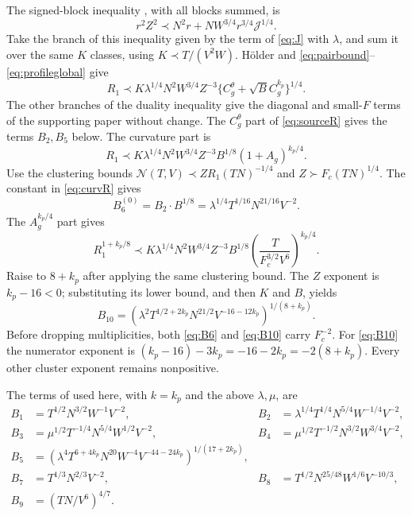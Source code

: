 \documentclass[11pt]{amsart}
\numberwithin{equation}{section}
\begin{document}
The signed-block inequality \cite[(\ref*{six-eq:rJ})]{Weighted}, with
all blocks summed, is
\[
 r^2Z^2\prec N^2r+NW^{3/4}r^{3/4}\mathcal J^{1/4}.
\]
Take the branch of this inequality given by the term of \eqref{eq:J}
with $\lambda$, and sum it over the same $K$ classes, using
\(K\prec T/(V^2W)\). H\"older and
\eqref{eq:pairbound}--\eqref{eq:profileglobal} give
\begin{equation}\label{eq:sourceR}
R_1\prec K\lambda^{1/4}N^2W^{3/4}Z^{-3}
       \{C_g^\theta+\sqrt B C_g^{k_p}\}^{1/4}.
\end{equation}
The other branches of the duality inequality give the diagonal
and small-$F$ terms of the supporting paper without change. The
\(C_g^\theta\) part of \eqref{eq:sourceR} gives the terms \(B_2,B_5\)
below. The curvature part is
\begin{equation}\label{eq:curvR}
R_1\prec K\lambda^{1/4}N^2W^{3/4}Z^{-3}
                        B^{1/8}(1+A_g)^{k_p/4}.
\end{equation}
Use the clustering bounds
\(\mathcal N(T,V)\prec ZR_1(TN)^{-1/4}\) and
\(Z\succ F_c(TN)^{1/4}\).
The constant in \eqref{eq:curvR} gives
\begin{equation}\label{eq:B6}
B_6^{(0)}=B_2\cdot B^{1/8}
     =\lambda^{1/4}T^{1/16}N^{21/16}V^{-2}.
\end{equation}
The \(A_g^{k_p/4}\) part gives
\[
 R_1^{1+k_p/8}\prec
 K\lambda^{1/4}N^2W^{3/4}Z^{-3}B^{1/8}
       \left(\frac{T}{F_c^{3/2}V^6}\right)^{k_p/4}.
\]
Raise to \(8+k_p\) after applying the same clustering bound.
The $Z$ exponent is \(k_p-16<0\); substituting its lower bound, and
then $K$ and $B$, yields
\begin{equation}\label{eq:B10}
\boxed{
 B_{10}=
 \left(\lambda^2T^{1/2+2k_p}N^{21/2}
                         V^{-16-12k_p}\right)^{1/(8+k_p)}.}
\end{equation}
Before dropping multiplicities, both \eqref{eq:B6} and \eqref{eq:B10} carry \(F_c^{-2}\).
For \eqref{eq:B10} the numerator exponent is
\((k_p-16)-3k_p=-16-2k_p=-2(8+k_p)\).
Every other cluster exponent remains nonpositive.

The terms of \cite[(\ref*{six-eq:nine})]{Weighted} used here, with
$k=k_p$ and the above $\lambda,\mu$, are
\[
\begin{aligned}
B_1&=T^{1/2}N^{3/2}W^{-1}V^{-2},&
B_2&=\lambda^{1/4}T^{1/4}N^{5/4}W^{-1/4}V^{-2},\\
B_3&=\mu^{1/2}T^{-1/4}N^{5/4}W^{1/2}V^{-2},&
B_4&=\mu^{1/2}T^{-1/2}N^{3/2}W^{3/4}V^{-2},\\
B_5&=(\lambda^4T^{6+4k_p}N^{20}W^{-4}V^{-44-24k_p})^{1/(17+2k_p)},\\
B_7&=T^{1/3}N^{2/3}V^{-2},&
B_8&=T^{1/2}N^{25/48}W^{1/6}V^{-10/3},\\
B_9&=(TN/V^6)^{4/7}.&&
\end{aligned}
\]
\end{document}
